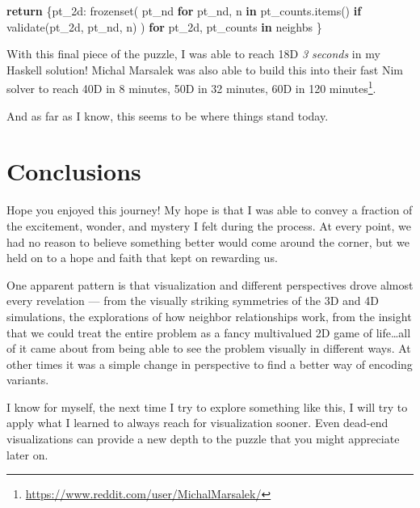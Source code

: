 \documentclass[]{article}
\newenvironment{Shaded}{}{}
\newcommand{\BuiltInTok}[1]{#1}
\newcommand{\ControlFlowTok}[1]{\textcolor[rgb]{0.00,0.44,0.13}{\textbf{#1}}}
\newcommand{\KeywordTok}[1]{\textcolor[rgb]{0.00,0.44,0.13}{\textbf{#1}}}
\newcommand{\NormalTok}[1]{#1}
\renewcommand{\href}[2]{#2\footnote{\url{#1}}}
\begin{document}
\begin{Shaded}
\begin{Highlighting}[]
    \ControlFlowTok{return}\NormalTok{ \{pt\_2d: }\BuiltInTok{frozenset}\NormalTok{(}
\NormalTok{                       pt\_nd }\ControlFlowTok{for}\NormalTok{ pt\_nd, n }\KeywordTok{in}\NormalTok{ pt\_counts.items()}
                             \ControlFlowTok{if}\NormalTok{ validate(pt\_2d, pt\_nd, n)}
\NormalTok{                   )}
              \ControlFlowTok{for}\NormalTok{ pt\_2d, pt\_counts }\KeywordTok{in}\NormalTok{ neighbs}
\NormalTok{           \}}
\end{Highlighting}
\end{Shaded}

With this final piece of the puzzle, I was able to reach 18D \emph{3 seconds} in
my Haskell solution! Michal Marsalek was also able to build this into their fast
Nim solver to \href{https://www.reddit.com/user/MichalMarsalek/}{reach 40D in 8
minutes, 50D in 32 minutes, 60D in 120 minutes}.

And as far as I know, this seems to be where things stand today.

\hypertarget{conclusions}{%
\section{Conclusions}\label{conclusions}}

Hope you enjoyed this journey! My hope is that I was able to convey a fraction
of the excitement, wonder, and mystery I felt during the process. At every
point, we had no reason to believe something better would come around the
corner, but we held on to a hope and faith that kept on rewarding us.

One apparent pattern is that visualization and different perspectives drove
almost every revelation --- from the visually striking symmetries of the 3D and
4D simulations, the explorations of how neighbor relationships work, from the
insight that we could treat the entire problem as a fancy multivalued 2D game of
life\ldots all of it came about from being able to see the problem visually in
different ways. At other times it was a simple change in perspective to find a
better way of encoding variants.

I know for myself, the next time I try to explore something like this, I will
try to apply what I learned to always reach for visualization sooner. Even
dead-end visualizations can provide a new depth to the puzzle that you might
appreciate later on.
\end{document}
